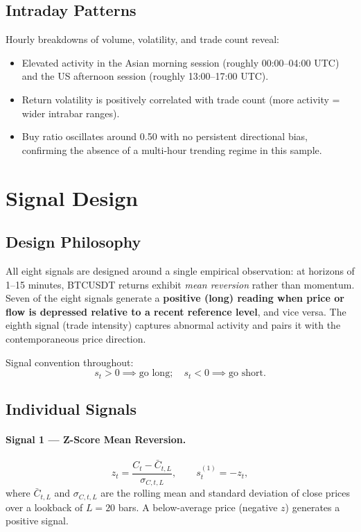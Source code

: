 \documentclass[11pt, a4paper]{article}
\begin{document}
\subsection{Intraday Patterns}

Hourly breakdowns of volume, volatility, and trade count reveal:

\begin{itemize}[leftmargin=2em, itemsep=0pt]
  \item Elevated activity in the Asian morning session (roughly 00:00--04:00 UTC)
        and the US afternoon session (roughly 13:00--17:00 UTC).
  \item Return volatility is positively correlated with trade count
        (more activity = wider intrabar ranges).
  \item Buy ratio oscillates around 0.50 with no persistent directional bias,
        confirming the absence of a multi-hour trending regime in this sample.
\end{itemize}

\section{Signal Design}
\label{sec:signals}

\subsection{Design Philosophy}

All eight signals are designed around a single empirical observation: at horizons
of 1--15 minutes, BTCUSDT returns exhibit \textit{mean reversion} rather than
momentum.  Seven of the eight signals generate a \textbf{positive (long) reading
when price or flow is depressed relative to a recent reference level}, and vice versa.
The eighth signal (trade intensity) captures abnormal activity and pairs it with
the contemporaneous price direction.

Signal convention throughout:
\[
s_t > 0 \implies \text{go long}; \quad s_t < 0 \implies \text{go short.}
\]

\subsection{Individual Signals}

\paragraph{Signal 1 --- Z-Score Mean Reversion.}
\[
z_t = \frac{C_t - \bar{C}_{t,L}}{\sigma_{C,t,L}},
\qquad
s^{(1)}_t = -z_t,
\]
where $\bar{C}_{t,L}$ and $\sigma_{C,t,L}$ are the rolling mean and standard
deviation of close prices over a lookback of $L = 20$ bars.  A below-average
price (negative $z$) generates a positive signal.
\end{document}
